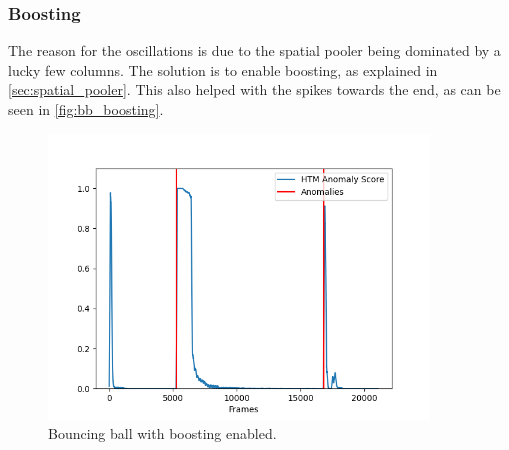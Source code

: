 \subsubsection{Boosting}
The reason for the oscillations is due to the spatial pooler being dominated by a lucky few columns. The solution is to enable boosting, as explained in \autoref{sec:spatial_pooler}. This also helped with the spikes towards the end, as can be seen in \autoref{fig:bb_boosting}.\par
\begin{figure}[H]
    \centering
    \includegraphics[width=0.9\textwidth]{resources/experiments/bouncing_ball/bb_anoms_boosting.png}
    \caption[Bouncing Ball Experiment Anomaly Score No Boosting]{Bouncing ball with boosting enabled.}
    \label{fig:bb_boosting}
\end{figure}
